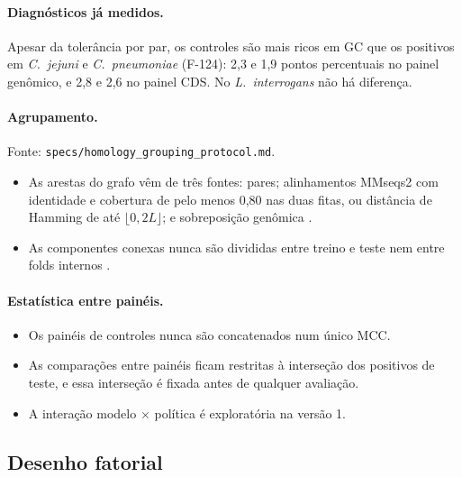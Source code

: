 \documentclass[11pt,a4paper]{article}
\newcommand{\arq}[1]{\nolinkurl{#1}}
\begin{document}
\paragraph{Diagnósticos já medidos.} Apesar da tolerância por par, os controles são mais ricos em GC que os positivos em \emph{C.\ jejuni} e \emph{C.\ pneumoniae} (F-124): 2,3 e 1,9 pontos percentuais no painel genômico, e 2,8 e 2,6 no painel CDS. No \emph{L.\ interrogans} não há diferença.

\paragraph{Agrupamento.} Fonte: \arq{specs/homology_grouping_protocol.md}.
\begin{itemize}[leftmargin=1.4em]
\item As arestas do grafo vêm de três fontes: pares; alinhamentos MMseqs2 com identidade e cobertura de pelo menos 0,80 nas duas fitas, ou distância de Hamming de até $\lfloor0{,}2L\rfloor$; e sobreposição genômica \citep{steinegger2017}.
\item As componentes conexas nunca são divididas entre treino e teste nem entre folds internos \citep{teufel2023,petti2022}.
\end{itemize}

\paragraph{Estatística entre painéis.}
\begin{itemize}[leftmargin=1.4em]
\item Os painéis de controles nunca são concatenados num único MCC.
\item As comparações entre painéis ficam restritas à interseção dos positivos de teste, e essa interseção é fixada antes de qualquer avaliação.
\item A interação modelo $\times$ política é exploratória na versão 1.
\end{itemize}

\subsection{Desenho fatorial}
\end{document}
